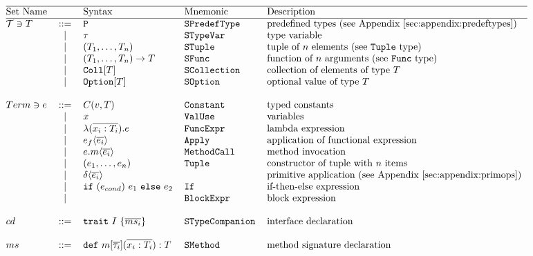 \[\begin{tabular}{@{}l c l l l} 
\hline
Set Name				&  			& Syntax	& Mnemonic 		& Description \\
\hline
$\mathcal{T} \ni T$	& ::= 		& \lst{P} 	& \lst{SPredefType}	& predefined types (see Appendix~\ref{sec:appendix:predeftypes}) \\

			&	$\mid$	& $\tau$	& \lst{STypeVar} & type variable \\
			&	$\mid$	& $(T_1, \dots ,T_n) $	& \lst{STuple} & tuple of $n$ elements (see \lst{Tuple} type)\\

			&   $\mid$  & $(T_1,\dots,T_n) \to T $	& \lst{SFunc} & function of $n$ arguments (see \lst{Func} type) \\
			&   $\mid$  & $\text{\lst{Coll}}[T]$			& \lst{SCollection} & collection of elements of type $T$   \\
			&   $\mid$  & $\text{\lst{Option}}[T]$		& \lst{SOption} & optional value of type $T$  \\
			& 	     	&									& 				&		\\

$Term\ni e$	& ::= 		&   $C(v, T)$				& \lst{Constant} & typed constants  \\
			& 	$\mid$ 	& 	$x$ 					& \lst{ValUse} & variables  \\
			& 	$\mid$ 	& 	$\TyLam{x_i}{T_i}{e}$ 		& \lst{FuncExpr} & lambda expression \\
			& 	$\mid$ 	& 	$\Apply{e_f}{\Ov{e_i}}$ 	& \lst{Apply} & application of functional expression \\
			& 	$\mid$ 	& 	$\Apply{e.m}{\Ov{e_i}}$		& \lst{MethodCall} & method invocation  \\
			& 	$\mid$ 	&   $\Tup{e_1, \dots ,e_n}$ 	& \lst{Tuple} & constructor of tuple with $n$ items \\
			& 	$\mid$ 	& 	$\Apply{\delta}{\Ov{e_i}}$ 	& & primitive application (see Appendix~\ref{sec:appendix:primops}) \\
			& 	$\mid$ 	& 	\lst{if} $(e_{cond})$ $e_1$ \lst{else} $e_2$ & \lst{If} & if-then-else expression \\
			& 	$\mid$ 	&   $$  & \lst{BlockExpr} & block expression \\
			& 	     	&										& &				\\
$cd$   		& ::= 		& 	$\Trait{I}{\Ov{ms_i}}$				& \lst{STypeCompanion} & interface declaration    \\
			& 	     	&										& &				\\
$ms$	   	& ::= 	& $\MSig{m[\Ov{\tau_i}]}{\overline{x_i : T_i}}{T}$ 	& \lst{SMethod} & method signature declaration   \\
\end{tabular}\] 

